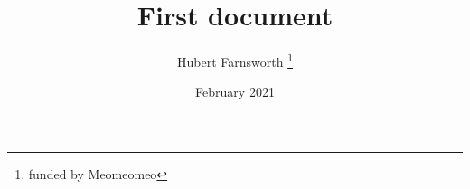\documentclass[15pt]{article}
\title{First document}
\author{Hubert Farnsworth \thanks{funded by Meomeomeo} }
\date{February 2021}
\begin{document}
   
\begin{titlepage} 
\maketitle
 \end{titlepage}
\end{document}
